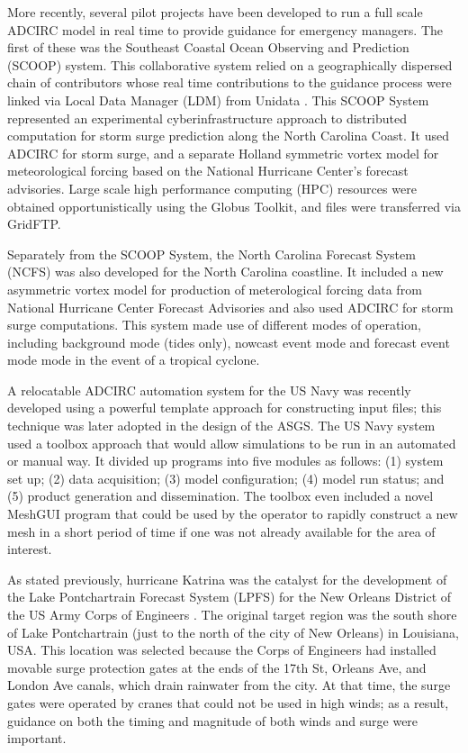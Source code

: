 \documentclass[jmse,article,submit,moreauthors,pdftex,12pt,a4paper]{mdpi}
\begin{document}
More recently, several pilot projects have been developed to run a 
full scale ADCIRC model in real time to provide guidance for 
emergency managers. The first of these was the Southeast Coastal 
Ocean Observing and Prediction (SCOOP) system. This collaborative 
system relied on a geographically dispersed chain of contributors 
whose real time contributions to the guidance process were linked 
via Local Data Manager (LDM) from Unidata \cite {RamakrishnanL2006}. 
This SCOOP System represented an experimental cyberinfrastructure 
approach to distributed computation for storm surge prediction along 
the North Carolina Coast. It used ADCIRC for storm surge, and a 
separate Holland\cite{HollandGJ1980} symmetric vortex model for 
meteorological forcing based on the National Hurricane Center's 
forecast advisories. Large scale high performance computing (HPC) 
resources were obtained opportunistically using the Globus Toolkit, 
and files were transferred via GridFTP.  

Separately from the SCOOP System, the North Carolina Forecast System 
(NCFS) \cite{MattocksC2006} was also developed for the North 
Carolina coastline. It included a new asymmetric vortex model for 
production of meterological forcing data from National Hurricane 
Center Forecast Advisories and also used ADCIRC for storm surge 
computations. This system made use of different modes of operation, 
including background mode (tides only), nowcast event mode and 
forecast event mode mode in the event of a tropical cyclone. 

A relocatable ADCIRC automation system for the US Navy was recently 
developed \cite{ChuP2009} using a powerful template approach for 
constructing input files; this technique was later adopted in the 
design of the ASGS. The US Navy system used a toolbox approach that 
would allow simulations to be run in an automated or manual way. It 
divided up programs into five modules as follows: (1) system set up; 
(2) data acquisition; (3) model configuration; (4) model run status; 
and (5) product generation and dissemination. The toolbox even 
included a novel MeshGUI program that could be used by the operator 
to rapidly construct a new mesh in a short period of time if one was 
not already available for the area of interest. 

As stated previously, hurricane Katrina was the catalyst for the 
development of the Lake Pontchartrain Forecast System (LPFS) for the 
New Orleans District of the US Army Corps of Engineers \cite 
{FlemingJG2008}. The original target region was the south shore of 
Lake Pontchartrain (just to the north of the city of New Orleans) in 
Louisiana, USA. This location was selected because the Corps of 
Engineers had installed movable surge protection gates at the ends 
of the 17th St, Orleans Ave, and London Ave canals, which drain 
rainwater from the city. At that time, the surge gates were operated 
by cranes that could not be used in high winds; as a result, 
guidance on both the timing and magnitude of both winds and surge 
were important.
\end{document}
